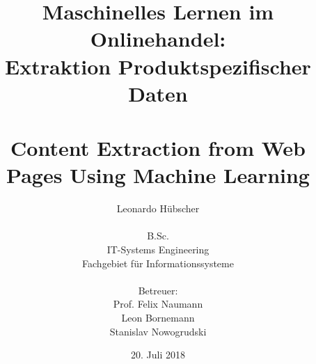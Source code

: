 \titlehead{
\vspace*{2cm}
\centering \texttt{[image: resources/hpi\_logo.eps]}
}
\subject{Bachelorarbeit}
\title{
Maschinelles Lernen im Onlinehandel: \\
Extraktion Produktspezifischer Daten \\
\bigskip \\
\large{Content Extraction from Web Pages Using Machine Learning}
\medskip \\
}
\author{
Leonardo Hübscher\\
\\B.Sc.\\
IT-Systems Engineering\\
Fachgebiet für Informationssysteme \\
\bigskip \\
Betreuer:\\
Prof. Felix Naumann\\
Leon Bornemann\\
Stanislav Nowogrudski
}
\date{20. Juli 2018}